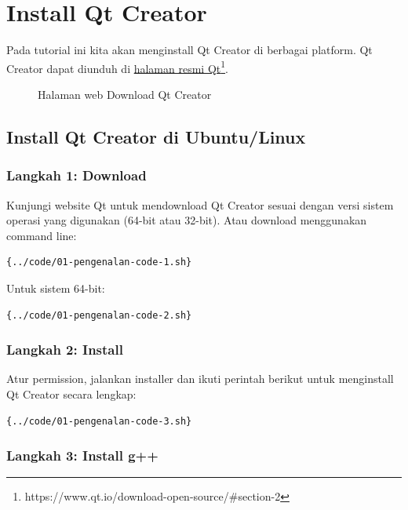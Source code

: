 \section{Install Qt Creator}

Pada tutorial ini kita akan menginstall Qt Creator di berbagai platform. Qt Creator dapat diunduh di \href{http://www.qt.io/download}{halaman resmi Qt}\footnote{https://www.qt.io/download-open-source/\#section-2}.

\begin{figure}[htbp]
\centering
{}
\label{halaman-web-download-qt}
\caption{Halaman web Download Qt Creator}
\end{figure}

\subsection{Install Qt Creator di Ubuntu/Linux}

\subsubsection{Langkah 1: Download}

Kunjungi website Qt untuk mendownload Qt Creator sesuai dengan versi sistem operasi yang digunakan (64-bit atau 32-bit). Atau download menggunakan command line:

\begin{lstlisting}[language=sh]{../code/01-pengenalan-code-1.sh}
\end{lstlisting}

Untuk sistem 64-bit:
\begin{lstlisting}[language=sh]{../code/01-pengenalan-code-2.sh}
\end{lstlisting}

\subsubsection{Langkah 2: Install}

Atur permission, jalankan installer dan ikuti perintah berikut untuk menginstall Qt Creator secara lengkap:

\begin{lstlisting}[language=sh]{../code/01-pengenalan-code-3.sh}
\end{lstlisting}

\subsubsection{Langkah 3: Install g++}

